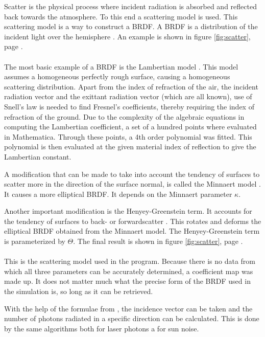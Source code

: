 Scatter is the physical process where incident radiation is absorbed and reflected back towards the atmosphere. To this end a scattering model is used. This scattering model is a way to construct a \ac{BRDF}. A \ac{BRDF} is a distribution of the incident light over the hemisphere \cite[pages 47-49]{rees}. An example is shown in figure \ref{fig:scatter}, page \pageref{fig:scatter}.\\\\
The most basic example of a \ac{BRDF} is the Lambertian model \cite[pages 49-50]{rees}. This model assumes a homogeneous perfectly rough surface, causing a homogeneous scattering distribution. Apart from the index of refraction of the air, the incident radiation vector and the exittant radiation vector (which are all known), use of Snell's law is needed to find Fresnel's coefficients, thereby requiring the index of refraction of the ground. Due to the complexity of the algebraic equations in computing the Lambertian coefficient, a set of a hundred points where evaluated in Mathematica. Through these points, a 4th order polynomial was fitted. This polynomial is then evaluated at the given material index of reflection to give the Lambertian constant.

A modification that can be made to take into account the tendency of surfaces to scatter more in the direction of the surface normal, is called the Minnaert model \cite[page 50]{rees}. It causes a more elliptical \ac{BRDF}. It depends on the Minnaert parameter $\kappa$.

Another important modification is the Henyey-Greenstein term. It accounts for the tendency of surfaces to back- or forwardscatter \cite[page 51]{rees}. This rotates and deforms the elliptical \ac{BRDF} obtained from the Minnaert model. The Henyey-Greenstein term is parameterized by $\Theta$. The final result is shown in figure \ref{fig:scatter}, page \pageref{fig:scatter}.\\\\
This is the scattering model used in the program. Because there is no data from which all three parameters can be accurately determined, a coefficient map was made up. It does not matter much what the precise form of the \ac{BRDF} used in the simulation is, so long as it can be retrieved.

With the help of the formulae from \cite[pages 43-51]{rees}, the incidence vector can be taken and the number of photons radiated in a specific direction can be calculated. This is done by the same algorithms both for laser photons a for sun noise.

